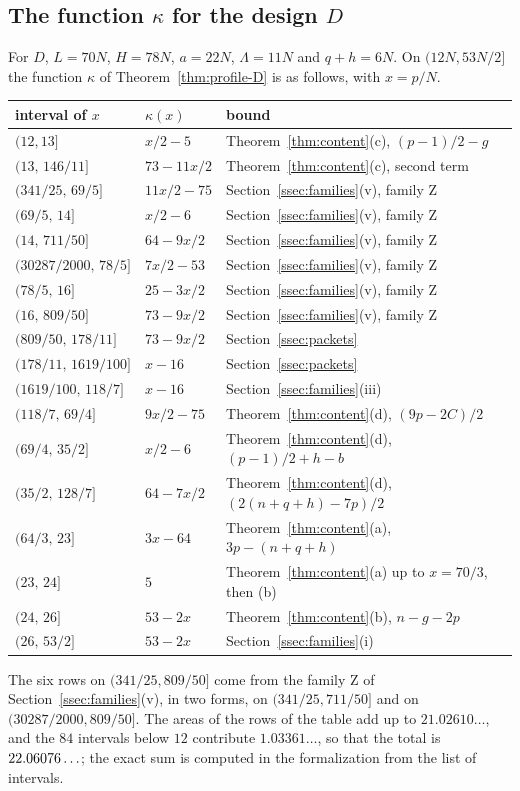 \subsection{The function $\kappa$ for the design $D$}\label{ssec:kappa}
For $D$, $L=70N$, $H=78N$, $a=22N$, $\Lambda=11N$ and $q+h=6N$. On $(12N,53N/2]$ the function $\kappa$ of
Theorem~\ref{thm:profile-D} is as follows, with $x=p/N$.
\begin{center}
\begin{tabular}{@{}lll@{}}
\toprule
interval of $x$ & $\kappa(x)$ & bound \\
\midrule
$(12,13]$ & $x/2-5$ & Theorem~\ref{thm:content}(c), $(p-1)/2-g$ \\
$(13,\,146/11]$ & $73-11x/2$ & Theorem~\ref{thm:content}(c), second term \\
$(341/25,\,69/5]$ & $11x/2-75$ & Section~\ref{ssec:families}(v), family Z \\
$(69/5,\,14]$ & $x/2-6$ & Section~\ref{ssec:families}(v), family Z \\
$(14,\,711/50]$ & $64-9x/2$ & Section~\ref{ssec:families}(v), family Z \\
$(30287/2000,\,78/5]$ & $7x/2-53$ & Section~\ref{ssec:families}(v), family Z \\
$(78/5,\,16]$ & $25-3x/2$ & Section~\ref{ssec:families}(v), family Z \\
$(16,\,809/50]$ & $73-9x/2$ & Section~\ref{ssec:families}(v), family Z \\
$(809/50,\,178/11]$ & $73-9x/2$ & Section~\ref{ssec:packets} \\
$(178/11,\,1619/100]$ & $x-16$ & Section~\ref{ssec:packets} \\
$(1619/100,\,118/7]$ & $x-16$ & Section~\ref{ssec:families}(iii) \\
$(118/7,\,69/4]$ & $9x/2-75$ & Theorem~\ref{thm:content}(d), $(9p-2C)/2$ \\
$(69/4,\,35/2]$ & $x/2-6$ & Theorem~\ref{thm:content}(d), $(p-1)/2+h-b$ \\
$(35/2,\,128/7]$ & $64-7x/2$ & Theorem~\ref{thm:content}(d), $(2(n+q+h)-7p)/2$ \\
$(64/3,\,23]$ & $3x-64$ & Theorem~\ref{thm:content}(a), $3p-(n+q+h)$ \\
$(23,\,24]$ & $5$ & Theorem~\ref{thm:content}(a) up to $x=70/3$, then (b) \\
$(24,\,26]$ & $53-2x$ & Theorem~\ref{thm:content}(b), $n-g-2p$ \\
$(26,\,53/2]$ & $53-2x$ & Section~\ref{ssec:families}(i) \\
\bottomrule
\end{tabular}
\end{center}
The six rows on $(341/25,809/50]$ come from the family Z of Section~\ref{ssec:families}(v), in two forms, on
$(341/25,711/50]$ and on $(30287/2000,809/50]$. The areas of the rows of the table add up to $21.02610\ldots$,
and the $84$ intervals below $12$ contribute $1.03361\ldots$, so that
the total is $22.06076\ldots$; the exact sum is computed in the formalization from the list of intervals.

